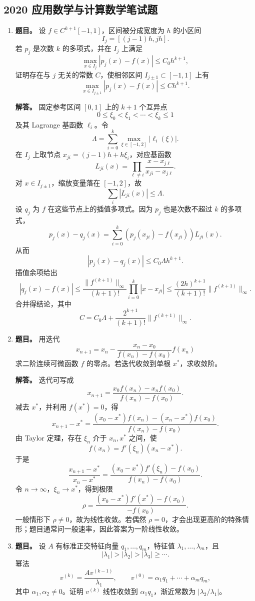 ﻿\documentclass[UTF8,12pt]{ctexart}
\begin{document}
\subsection{2020 应用数学与计算数学笔试题}
\begin{enumerate}[label=\textbf{\arabic*.},leftmargin=2.2em]
\item \textbf{题目。} 设 \(f\in C^{k+1}[-1,1]\)，区间被分成宽度为 \(h\) 的小区间
\[
I_j=[(j-1)h,jh].
\]
若 \(p_j\) 是次数 \(k\) 的多项式，并在 \(I_j\) 上满足
\[
\max_{x\in I_j}|p_j(x)-f(x)|\le C_0h^{k+1},
\]
证明存在与 \(j\) 无关的常数 \(C\)，使相邻区间 \(I_{j\pm1}\subset[-1,1]\) 上有
\[
\max_{x\in I_{j\pm1}}|p_j(x)-f(x)|\le Ch^{k+1}.
\]

\textbf{解答。} 固定参考区间 \([0,1]\) 上的 \(k+1\) 个互异点
\[
0\le \xi_0<\xi_1<\cdots<\xi_k\le1
\]
及其 Lagrange 基函数 \(\ell_i\)。令
\[
\Lambda=\sum_{i=0}^k\max_{\xi\in[-1,2]}|\ell_i(\xi)|.
\]
在 \(I_j\) 上取节点 \(x_{ji}=(j-1)h+h\xi_i\)，对应基函数
\[
L_{ji}(x)=\prod_{\ell\ne i}\frac{x-x_{j\ell}}{x_{ji}-x_{j\ell}}.
\]
对 \(x\in I_{j\pm1}\)，缩放变量落在 \([-1,2]\)，故
\[
\sum_i |L_{ji}(x)|\le\Lambda.
\]
设 \(q_j\) 为 \(f\) 在这些节点上的插值多项式。因为 \(p_j\) 也是次数不超过 \(k\) 的多项式，
\[
p_j(x)-q_j(x)=\sum_{i=0}^k (p_j(x_{ji})-f(x_{ji}))L_{ji}(x).
\]
从而
\[
|p_j(x)-q_j(x)|\le C_0\Lambda h^{k+1}.
\]
插值余项给出
\[
|q_j(x)-f(x)|\le
\frac{\|f^{(k+1)}\|_\infty}{(k+1)!}\prod_{i=0}^k |x-x_{ji}|
\le \frac{(2h)^{k+1}}{(k+1)!}\|f^{(k+1)}\|_\infty .
\]
合并得结论，其中
\[
C=C_0\Lambda+\frac{2^{k+1}}{(k+1)!}\|f^{(k+1)}\|_\infty.
\]

\item \textbf{题目。} 用迭代
\[
x_{n+1}=x_n-\frac{x_n-x_0}{f(x_n)-f(x_0)}f(x_n)
\]
求二阶连续可微函数 \(f\) 的零点。若迭代收敛到单根 \(x^\ast\)，求收敛阶。

\textbf{解答。} 迭代可写成
\[
x_{n+1}=\frac{x_0f(x_n)-x_nf(x_0)}{f(x_n)-f(x_0)}.
\]
减去 \(x^\ast\)，并利用 \(f(x^\ast)=0\)，得
\[
x_{n+1}-x^\ast
=\frac{(x_0-x^\ast)f(x_n)-(x_n-x^\ast)f(x_0)}
{f(x_n)-f(x_0)}.
\]
由 Taylor 定理，存在 \(\xi_n\) 介于 \(x_n,x^\ast\) 之间，使
\[
f(x_n)=f'(\xi_n)(x_n-x^\ast).
\]
于是
\[
\frac{x_{n+1}-x^\ast}{x_n-x^\ast}
=\frac{(x_0-x^\ast)f'(\xi_n)-f(x_0)}
{f(x_n)-f(x_0)}.
\]
令 \(n\to\infty\)，\(\xi_n\to x^\ast\)，得到极限
\[
\rho=\frac{(x_0-x^\ast)f'(x^\ast)-f(x_0)}{-f(x_0)}.
\]
一般情形下 \(\rho\ne0\)，故为线性收敛。若偶然 \(\rho=0\)，才会出现更高阶的特殊情形；题目通常问一般速率，因此答案为一阶线性收敛。

\item \textbf{题目。} 设 \(A\) 有标准正交特征向量 \(q_1,\ldots,q_m\)，特征值 \(\lambda_1,\ldots,\lambda_m\)，且
\[
|\lambda_1|>|\lambda_2|>|\lambda_3|\ge\cdots .
\]
幂法
\[
v^{(k)}=\frac{A v^{(k-1)}}{\lambda_1},\qquad
v^{(0)}=\alpha_1q_1+\cdots+\alpha_mq_m,
\]
其中 \(\alpha_1,\alpha_2\ne0\)。证明 \(v^{(k)}\) 线性收敛到 \(\alpha_1q_1\)，渐近常数为 \(|\lambda_2/\lambda_1|\)。


\end{enumerate}
\end{document}
